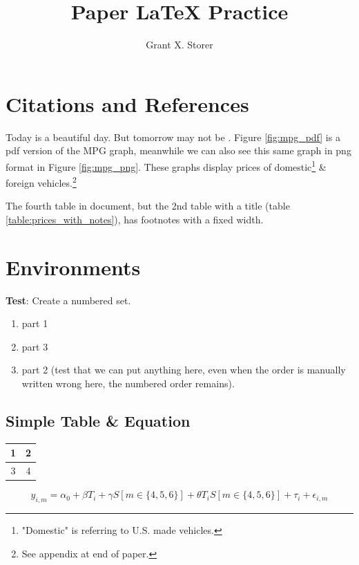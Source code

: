 \documentclass[11pt,letterpaper]{article}
\author{Grant X. Storer}
\title{Paper LaTeX Practice}
\begin{document}
\maketitle
\section{Citations and References}

Today is a beautiful day. But tomorrow may not be \parencite{storer2023sweet}. Figure \ref{fig:mpg_pdf} is a pdf version of the MPG graph, meanwhile we can also see this same graph in png format in Figure \ref{fig:mpg_png}. These graphs display prices of domestic\footnote{"Domestic" is referring to U.S. made vehicles.\label{fnote:domestic}} 
\& foreign vehicles.\footnote{See appendix at end of paper.\label{fnote:back}}

The fourth table in document, but the 2nd table with a title (table \ref{table:prices_with_notes}), has footnotes with a fixed width. 

\section{Environments}

\textbf{Test}: Create a numbered set. 
\begin{enumerate}
\item part 1
\item part 3
\item part 2 (test that we can put anything here, even when the order is manually written wrong here, the numbered order remains).
\end{enumerate}

\subsection{Simple Table \& Equation}

\begin{table}[htbp]\centering
\begin{tabular}{|c|c|}
\hline 
1 & 2 \\ 
\hline 
3 & 4 \\ 
\hline 
\end{tabular} 
\end{table}

\begin{equation}
\label{eq:DID}
y_{i,m} = \alpha_0 + \beta{T}_{i} + \gamma{S}[m \in \{4,5,6\}] + \theta{T}_{i}{S}[m \in \{4,5,6\}] + \tau_{i} + \epsilon_{i,m}
\end{equation}
\end{document}
